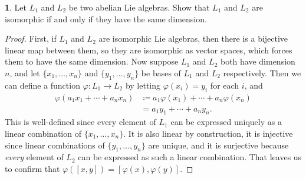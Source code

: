 \documentclass[12pt]{article}
\theoremstyle{definition}
\newtheorem{ex}{}
\begin{document}
\begin{ex}
	Let $L_1$ and $L_2$ be two abelian Lie algebras.
	Show that $L_1$ and $L_2$ are isomorphic if and only if they have the same dimension.
\end{ex}
\begin{proof}
	First, if $L_1$ and $L_2$ are isomorphic Lie algebras, then there is a bijective linear map between them, so they are isomorphic as vector spaces, which forces them to have the same dimension.
	Now suppose $L_1$ and $L_2$ both have dimension $n$, and let $\lbrace x_1, \dots, x_n \rbrace$ and $\lbrace y_1, \dots, y_n \rbrace$ be bases of $L_1$ and $L_2$ respectively.
	Then we can define a function $\varphi : L_1 \to L_2$ by letting $\varphi(x_i) = y_i$ for each $i$, and \begin{align*}
		\varphi(a_1x_1 + \cdots + a_nx_n) & \coloneq a_1\varphi(x_1) + \cdots + a_n\varphi(x_n) \\
		                                  & = a_1y_1 + \cdots + a_ny_n.
	\end{align*}
	This is well-defined since every element of $L_1$ can be expressed uniquely as a linear combination of $\lbrace x_1, \dots, x_n \rbrace$.
	It is also linear by construction, it is injective since linear combinations of $\lbrace y_1, \dots, y_n \rbrace$ are unique, and it is surjective because \textit{every} element of $L_2$ can be expressed as such a linear combination.
	That leaves us to confirm that $\varphi([x, y]) = [\varphi(x), \varphi(y)]$.


\end{proof}
\end{document}
